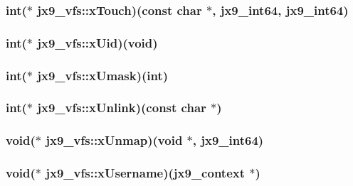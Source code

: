 \hypertarget{structjx9__vfs_a3c747a49be1736e8347d381fef69a920}{
\subsubsection[{x\-Touch}]{\setlength{\rightskip}{0pt plus 5cm}int($\ast$ jx9\-\_\-vfs\-::x\-Touch)(const char $\ast$, {\bf jx9\-\_\-int64}, {\bf jx9\-\_\-int64})}}\label{da/d75/structjx9__vfs_a3c747a49be1736e8347d381fef69a920}
\hypertarget{structjx9__vfs_ab9efc62e64316ba92a365dce7329dc1b}{
\subsubsection[{x\-Uid}]{\setlength{\rightskip}{0pt plus 5cm}int($\ast$ jx9\-\_\-vfs\-::x\-Uid)(void)}}\label{da/d75/structjx9__vfs_ab9efc62e64316ba92a365dce7329dc1b}
\hypertarget{structjx9__vfs_acfb2d8db57d6f4b3c9799b03ce93e510}{
\subsubsection[{x\-Umask}]{\setlength{\rightskip}{0pt plus 5cm}int($\ast$ jx9\-\_\-vfs\-::x\-Umask)(int)}}\label{da/d75/structjx9__vfs_acfb2d8db57d6f4b3c9799b03ce93e510}
\hypertarget{structjx9__vfs_a121bf9faca9e0eddc65390c784659a81}{
\subsubsection[{x\-Unlink}]{\setlength{\rightskip}{0pt plus 5cm}int($\ast$ jx9\-\_\-vfs\-::x\-Unlink)(const char $\ast$)}}\label{da/d75/structjx9__vfs_a121bf9faca9e0eddc65390c784659a81}
\hypertarget{structjx9__vfs_add213ec7c13586407a3cb48332fb11dd}{
\subsubsection[{x\-Unmap}]{\setlength{\rightskip}{0pt plus 5cm}void($\ast$ jx9\-\_\-vfs\-::x\-Unmap)(void $\ast$, {\bf jx9\-\_\-int64})}}\label{da/d75/structjx9__vfs_add213ec7c13586407a3cb48332fb11dd}
\hypertarget{structjx9__vfs_ae7f3d554677765db1437f6a6526c63ca}{
\subsubsection[{x\-Username}]{\setlength{\rightskip}{0pt plus 5cm}void($\ast$ jx9\-\_\-vfs\-::x\-Username)({\bf jx9\-\_\-context} $\ast$)}}\label{da/d75/structjx9__vfs_ae7f3d554677765db1437f6a6526c63ca}
